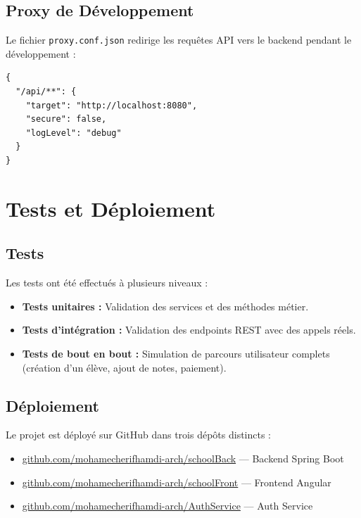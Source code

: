 \documentclass[12pt,a4paper,twoside]{report}
\begin{document}
\section{Proxy de Développement}
Le fichier \texttt{proxy.conf.json} redirige les requêtes API vers le backend pendant le développement :

\begin{lstlisting}[style=jsonStyle, caption=Proxy configuration]
{
  "/api/**": {
    "target": "http://localhost:8080",
    "secure": false,
    "logLevel": "debug"
  }
}
\end{lstlisting}

\chapter{Tests et Déploiement}

\section{Tests}

Les tests ont été effectués à plusieurs niveaux :
\begin{itemize}[leftmargin=*]
  \item \textbf{Tests unitaires :} Validation des services et des méthodes métier.
  \item \textbf{Tests d'intégration :} Validation des endpoints REST avec des appels réels.
  \item \textbf{Tests de bout en bout :} Simulation de parcours utilisateur complets (création d'un élève, ajout de notes, paiement).
\end{itemize}

\section{Déploiement}

Le projet est déployé sur GitHub dans trois dépôts distincts :
\begin{itemize}[leftmargin=*]
  \item \url{github.com/mohamecherifhamdi-arch/schoolBack} — Backend Spring Boot
  \item \url{github.com/mohamecherifhamdi-arch/schoolFront} — Frontend Angular
  \item \url{github.com/mohamecherifhamdi-arch/AuthService} — Auth Service
\end{itemize}
\end{document}
